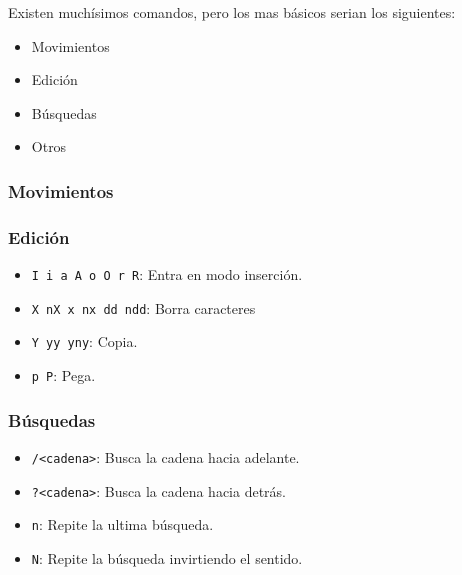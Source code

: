 \documentclass[10pt]{beamer}
\begin{document}
  
  \begin{frame}
    Existen muchísimos comandos, pero los mas básicos serian los siguientes:
    \begin{itemize}
      \item Movimientos
      \item Edición
      \item Búsquedas
      \item Otros
    \end{itemize}
  \end{frame}
  
  \begin{frame}[containsverbatim]
    \frametitle{Movimientos}
  \end{frame}
  
  \begin{frame}[containsverbatim]
    \frametitle{Edición}
    \begin{itemize}
      \item \verb+I i a A o O r R+: Entra en modo inserción.
      \item \verb+X nX x nx dd ndd+: Borra caracteres
      \item \verb+Y yy yny+: Copia.
      \item \verb+p P+: Pega.
    \end{itemize}
  \end{frame}
  
  \begin{frame}[containsverbatim]
    \frametitle{Búsquedas}
    \begin{itemize}
      \item \verb+/<cadena>+: Busca la cadena hacia adelante.
      \item \verb+?<cadena>+: Busca la cadena hacia detrás.
      \item \verb+n+: Repite la ultima búsqueda.
      \item \verb+N+: Repite la búsqueda invirtiendo el sentido.
    \end{itemize}
  \end{frame}
  
\end{document}

